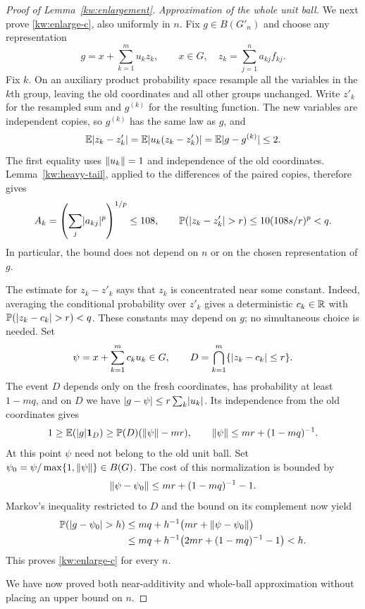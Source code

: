 \begin{proof}[Proof of Lemma~\ref{kw:enlargement}]
\emph{Approximation of the whole unit ball.}
We next prove \eqref{kw:enlarge-c}, also uniformly in $n$.
Fix $g\in B(G'_n)$ and choose any representation
\[
 g=x+\sum_{k=1}^m u_kz_k,\qquad
 x\in G,\quad z_k=\sum_{j=1}^n a_{kj}f_{kj}.
\]
Fix $k$.  On an auxiliary product probability space resample all the
variables in the $k$th group, leaving the old coordinates and all other
groups unchanged.  Write $z'_k$ for the resampled sum and $g^{(k)}$
for the resulting function.  The new variables are independent copies,
so $g^{(k)}$ has the same law as $g$, and
\[
 \mathbb E\lvert z_k-z'_k\rvert
 =\mathbb E\lvert u_k(z_k-z'_k)\rvert
 =\mathbb E\lvert g-g^{(k)}\rvert\le2.
\]
The first equality uses $\lVert u_k\rVert=1$ and independence of the old
coordinates.  Lemma~\ref{kw:heavy-tail}, applied to the differences of
the paired copies, therefore gives
\begin{equation}\label{kw:coefficient-bound}
 A_k=\left(\sum_j\lvert a_{kj}\rvert^p\right)^{1/p}\le108,
 \qquad
 \mathbb P(\lvert z_k-z'_k\rvert>r)\le10(108s/r)^p<q.
\end{equation}
In particular, the bound does not depend on $n$ or on the chosen
representation of $g$.

The estimate for $z_k-z'_k$ says that $z_k$ is concentrated near some
constant.  Indeed, averaging the conditional probability over $z'_k$
gives a deterministic $c_k\in\mathbb R$ with
$\mathbb P(\lvert z_k-c_k\rvert>r)<q$.
These constants may depend on $g$; no simultaneous choice is needed.
Set
\[
 \psi=x+\sum_{k=1}^m c_ku_k\in G,
 \qquad D=\bigcap_{k=1}^m\{\lvert z_k-c_k\rvert\le r\}.
\]
The event $D$ depends only on the fresh coordinates, has probability
at least $1-mq$, and on $D$ we have
$\lvert g-\psi\rvert\le r\sum_k\lvert u_k\rvert$.
Its independence from the old coordinates gives
\[
 1\ge\mathbb E(\lvert g\rvert\mathbf1_D)
 \ge\mathbb P(D)(\lVert\psi\rVert-mr),
 \qquad \lVert\psi\rVert\le mr+(1-mq)^{-1}.
\]
At this point $\psi$ need not belong to the old unit ball.  Set
$\psi_0=\psi/\max\{1,\lVert\psi\rVert\}\in B(G)$.  The cost of this normalization
is bounded by
\[
 \lVert\psi-\psi_0\rVert
 \le mr+(1-mq)^{-1}-1.
\]
Markov's inequality restricted to $D$ and the bound on its complement
now yield
\begin{align*}
 \mathbb P(\lvert g-\psi_0\rvert>h)
 &\le mq+h^{-1}\bigl(mr+\lVert\psi-\psi_0\rVert\bigr)\\
 &\le mq+h^{-1}\bigl(2mr+(1-mq)^{-1}-1\bigr)<h.
\end{align*}
This proves \eqref{kw:enlarge-c} for every $n$.

We have now proved both near-additivity and whole-ball approximation
without placing an upper bound on $n$.


\end{proof}
